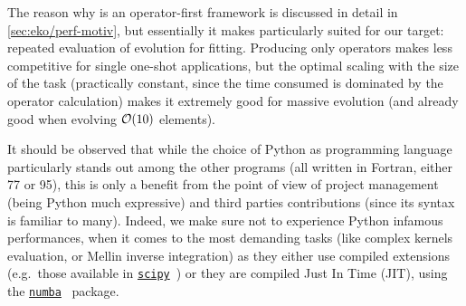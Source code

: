 The reason why \eko{} is an operator-first framework is discussed in detail in
\cref{sec:eko/perf-motiv}, but essentially it makes \eko{} particularly suited
for our target: repeated evaluation of evolution for \pdf{} fitting.
Producing only operators makes \eko{} less competitive for single one-shot
applications, but the optimal scaling with the size of the task (practically
constant, since the time consumed is dominated by the operator calculation)
makes it extremely good for massive evolution (and already good when evolving
$\order{10}$ elements).

It should be observed that while the choice of Python as programming language
particularly stands out among the other programs (all written in Fortran,
either 77 or 95), this is only a benefit from the point of view of project
management (being Python much expressive) and third parties contributions
(since its syntax is familiar to many).
Indeed, we make sure not to experience Python infamous performances, when it
comes to the most demanding tasks (like complex kernels evaluation, or Mellin
inverse integration) as they either use compiled extensions (e.g.\ those available
in \href{https://scipy.org/}{\texttt{scipy}}~\cite{2020SciPy-NMeth}) or they are compiled Just In
Time (JIT), using the \href{https://numba.pydata.org/}{\texttt{numba}}~\cite{numba} package.


